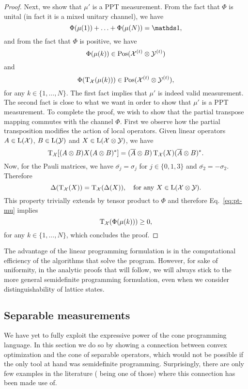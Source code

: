 \begin{proof}
Next, we show that $\mu'$ is a PPT measurement. From the fact that $\Phi$ is unital 
(in fact it is a mixed unitary channel), we have
\begin{equation}
  \Phi(\mu(1)) + \ldots + \Phi(\mu(N)) = \I,
\end{equation}
and from the fact that $\Phi$ is positive, we have 
\begin{equation}
  \Phi(\mu(k)) \in\mathrm{Pos}(\mathcal{X}^{(t)}\otimes\mathcal{Y}^{(t)})
\end{equation}
and
\begin{equation}
\label{eq:pt-mu}
  \Phi(\operatorname{T}_{\mathcal{X}}(\mu(k))) \in\mathrm{Pos}(\mathcal{X}^{(t)}\otimes\mathcal{Y}^{(t)}),
\end{equation}
for any $k \in \{1, \ldots, N \}$. 
The first fact implies that $\mu'$ is indeed valid measurement.
The second fact is close to what we want in order to show that $\mu'$ is a PPT measurement.
To complete the proof, we wish to show that the partial transpose mapping commutes 
with the channel $\Phi$.
First we observe how the partial transposition modifies the action of local operators.
Given linear operators $A\in \mathrm{L}(\mathcal{X})$, $B \in \mathrm{L}(\mathcal{Y})$ and $X \in \mathrm{L}(\mathcal{X} \otimes \mathcal{Y})$, 
we have
\begin{equation}
  \operatorname{T}_{\mathcal{X}} [(A \otimes B)X(A \otimes B)^{*}] = 
  (\overline{A}\otimes B)\operatorname{T}_{\mathcal{X}}(X)(\overline{A}\otimes B)^{*}.
\end{equation}
Now, for the Pauli matrices, we have $\overline{\sigma_{j}} = \sigma_{j}$ 
for $j \in \{ 0,1,3\}$ and $\overline{\sigma_{2}} = -\sigma_{2}$. 
Therefore 
\begin{equation}
  \Delta(\operatorname{T}_{\mathcal{X}}(X)) = \operatorname{T}_{\mathcal{X}}(\Delta(X)), \quad \text{for any $X \in \mathrm{L}(\mathcal{X}\otimes\mathcal{Y})$}.
\end{equation}
This property trivially extends by tensor product to $\Phi$ and therefore 
Eq.~\eqref{eq:pt-mu} implies
\begin{equation}
  \operatorname{T}_{\mathcal{X}}(\Phi(\mu(k))) \geq 0, 
\end{equation}
for any $k \in \{1, \ldots, N\}$, which concludes the proof.
\end{proof}

The advantage of the linear programming formulation is in the computational 
efficiency of the algorithms that solve the program.
However, for sake of uniformity, in the analytic proofs that will follow, 
we will always stick to the more general semidefinite programming formulation, 
even when we consider distinguishability of lattice states.

\subsection{Separable measurements}
We have yet to fully exploit the expressive power of the cone programming language.
In this section we do so by showing a connection between convex optimization and
the cone of separable operators, which would not be possible if the only tool at 
hand was semidefinite programming. 
Surprisingly, there are only few examples in the literature (\cite{Gharibian13}
being one of those) where this connection has been made use of.

